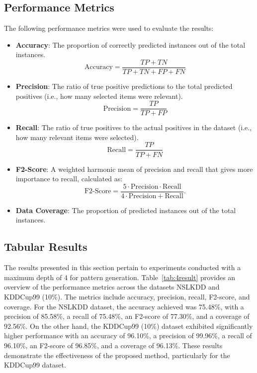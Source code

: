 \documentclass[pdflatex,sn-mathphys-num]{sn-jnl}%
\theoremstyle{thmstyleone}%
\theoremstyle{thmstyletwo}%
\theoremstyle{thmstylethree}%
\begin{document}
\subsection{Performance Metrics}
The following performance metrics were used to evaluate the results:

\begin{itemize} 
    \item \textbf{Accuracy}: The proportion of correctly predicted instances out of the total instances.
    \[
    \text{Accuracy} = \frac{TP + TN}{TP + TN + FP + FN}
    \]
    \item \textbf{Precision}: The ratio of true positive predictions to the total predicted positives (i.e., how many selected items were relevant).
    \[
    \text{Precision} = \frac{TP}{TP+FP}
    \]
    \item \textbf{Recall}: The ratio of true positives to the actual positives in the dataset (i.e., how many relevant items were selected).
    \[
    \text{Recall} = \frac{TP}{TP+FN}
    \]
    \item \textbf{F2-Score}: A weighted harmonic mean of precision and recall that gives more importance to recall, calculated as:
    \[
    \text{F2-Score} = \frac{5 \cdot \text{Precision} \cdot \text{Recall}}{4 \cdot \text{Precision} + \text{Recall}}.
    \]
    \item \textbf{Data Coverage}: The proportion of predicted instances out of the total instances.
\end{itemize}

\subsection{Tabular Results}
The results presented in this section pertain to experiments conducted with a maximum depth of 4 for pattern generation.
Table~\ref{tab:4result} provides an overview of the performance metrics across the datasets NSLKDD and KDDCup99 (10\%).
The metrics include accuracy, precision, recall, F2-score, and coverage.
For the NSLKDD dataset, the accuracy achieved was 75.48\%, with a precision of 85.58\%, a recall of 75.48\%, an F2-score of 77.30\%, and a coverage of 92.56\%.
On the other hand, the KDDCup99 (10\%) dataset exhibited significantly higher performance with an accuracy of 96.10\%, a precision of 99.96\%, a recall of 96.10\%, an F2-score of 96.85\%, and a coverage of 96.13\%.
These results demonstrate the effectiveness of the proposed method, particularly for the KDDCup99 dataset.
\end{document}
